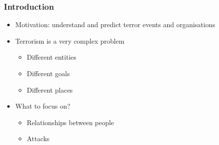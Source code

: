 \begin{frame}
\frametitle{Introduction}

\begin{itemize}
	\item Motivation: understand and predict terror events and organisations
	\item Terrorism is a very complex problem
	\begin{itemize}
		\item Different entities
		\item Different goals
		\item Different places
	\end{itemize}
	\item What to focus on?
	\begin{itemize}
		\item Relationships between people
		\item Attacks
	\end{itemize}
\end{itemize}

\end{frame}
